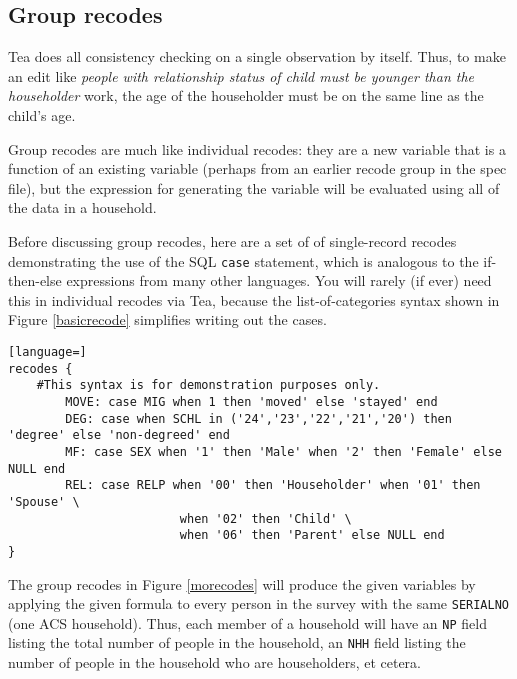 \documentclass{article}
\begin{document}


\subsection{Group recodes} Tea does all consistency checking on a single observation by
itself. Thus, to make an edit like {\em people with relationship status of child must
be younger than the householder} work, the age of the householder must be on the same line
as the child's age.

Group recodes are much like individual recodes: they are a new variable that is a function
of an existing variable (perhaps from an earlier recode group in the spec file), but the
expression for generating the variable will be evaluated using all of the data in a
household. 

Before discussing group recodes, here are a set of of single-record recodes
demonstrating the use of the SQL {\tt case} statement,
which is analogous to the if-then-else expressions from many other languages. You will
rarely (if ever) need this in individual recodes via Tea, because the list-of-categories
syntax shown in Figure \ref{basicrecode} simplifies writing out the cases.

\begin{lstlisting}[language=]
recodes {
    #This syntax is for demonstration purposes only.
        MOVE: case MIG when 1 then 'moved' else 'stayed' end
        DEG: case when SCHL in ('24','23','22','21','20') then 'degree' else 'non-degreed' end
        MF: case SEX when '1' then 'Male' when '2' then 'Female' else NULL end
        REL: case RELP when '00' then 'Householder' when '01' then 'Spouse' \
                        when '02' then 'Child' \
                        when '06' then 'Parent' else NULL end
}
\end{lstlisting}

The group recodes in Figure \ref{morecodes} will produce the given variables
by applying the given formula to every person in the survey with the same {\tt SERIALNO}
(one ACS household). Thus, each member of a household will have an {\tt NP} field listing
the total number of people in the household, an {\tt NHH} field listing the number of
people in the household who are householders, et cetera. 
\end{document}
